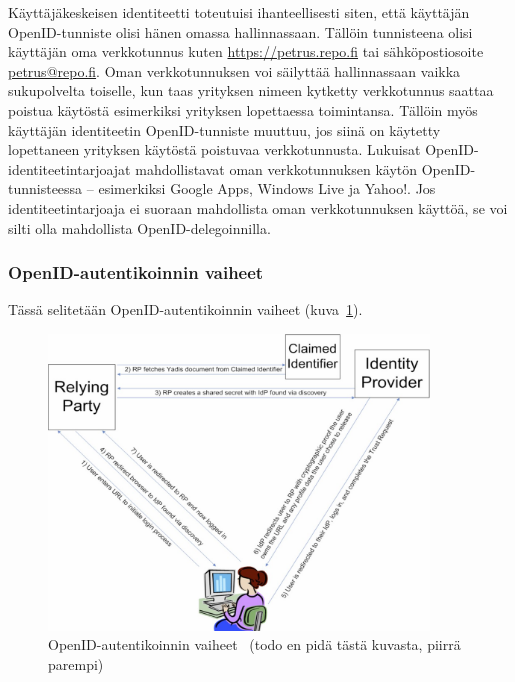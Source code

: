 \documentclass[finnish,gradu]{tktltiki}
\begin{document}
  Käyttäjäkeskeisen identiteetti toteutuisi ihanteellisesti siten, että käyttäjän OpenID-tunniste olisi hänen omassa hallinnassaan. Tällöin tunnisteena olisi käyttäjän oma verkkotunnus kuten \url{https://petrus.repo.fi} tai sähköpostiosoite \url{petrus@repo.fi}. Oman verkkotunnuksen voi säilyttää hallinnassaan vaikka sukupolvelta toiselle, kun taas yrityksen nimeen kytketty verkkotunnus saattaa poistua käytöstä esimerkiksi yrityksen lopettaessa toimintansa. Tällöin myös käyttäjän identiteetin OpenID-tunniste muuttuu, jos siinä on käytetty lopettaneen yrityksen käytöstä poistuvaa verkkotunnusta. Lukuisat OpenID-identiteetintarjoajat mahdollistavat oman verkkotunnuksen käytön OpenID-tunnisteessa -- esimerkiksi Google Apps, Windows Live ja Yahoo!. Jos identiteetintarjoaja ei suoraan mahdollista oman verkkotunnuksen käyttöä, se voi silti olla mahdollista OpenID-delegoinnilla.

  \subsubsection{OpenID-autentikoinnin vaiheet} %
  \label{ssub:openid_autentikoinnin_vaiheet}

  Tässä selitetään OpenID-autentikoinnin vaiheet (kuva~\ref{fig:basic_openid_flow}).

  \begin{figure}
    \centering
    \includegraphics[width=0.9\textwidth]{images/openid_flow_recordon06.jpg}
    \caption{OpenID-autentikoinnin vaiheet~\cite{openid_recordon_2009} (todo en pidä tästä kuvasta, piirrä parempi)}
    \label{fig:basic_openid_flow}
  \end{figure}
\end{document}
